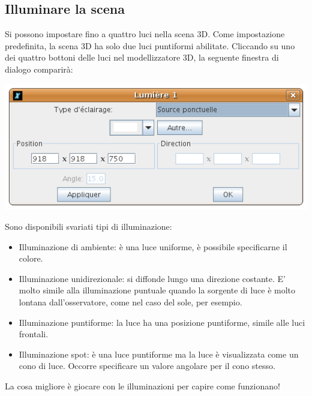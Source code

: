 \subsection{Illuminare la scena}
Si possono impostare fino a quattro luci nella scena 3D. Come impostazione predefinita, la scena 3D ha solo due luci puntiformi abilitate. Cliccando su uno dei quattro bottoni delle luci nel modellizzatore 3D, la seguente finestra di dialogo comparirà:
\begin{center}
	\includegraphics*[scale=0.6]{pics/CaptureLight.png}
\end{center}
Sono disponibili svariati tipi di illuminazione:
\begin{itemize}
	\item Illuminazione di ambiente: è una luce uniforme, è possibile specificarne il colore.
	\item Illuminazione unidirezionale: si diffonde lungo una direzione costante. E' molto simile alla illuminazione puntuale quando la sorgente di luce è molto lontana dall'osservatore, come nel caso del sole, per esempio.
	\item Illuminazione puntiforme: la luce ha una posizione puntiforme, simile alle luci frontali.
	\item Illuminazione spot: è una luce puntiforme ma la luce è visualizzata come un cono di luce. Occorre specificare un valore angolare per il cono stesso.
\end{itemize}
La cosa migliore è giocare con le illuminazioni per capire come funzionano!


